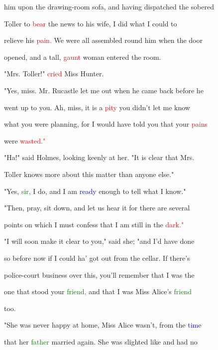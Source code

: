  him upon the drawing-room sofa, and having dispatched the sobered

 Toller to \textcolor{red}{bear} the news to his wife, I did what I could to

 relieve his \textcolor{red}{pain.} We were all assembled round him when the door

 opened, and a tall, \textcolor{red}{gaunt} woman entered the room.



 "Mrs. Toller!" \textcolor{red}{cried} Miss \textcolor{BurntOrange}{Hunter.}



 "Yes, miss. Mr. Rucastle let me out when he came back before he

 went up to you. Ah, miss, it is a \textcolor{red}{pity} you didn't let me know

 what you were \textcolor{BurntOrange}{planning,} for I would have told you that your \textcolor{red}{pains}

 were \textcolor{red}{wasted."}



 "Ha!" said Holmes, looking keenly at her. "It is clear that Mrs.

 Toller knows more about this matter than anyone else."



 "Yes, \textcolor{green}{sir,} I do, and I am \textcolor{blue}{ready} enough to tell what I know."



 "Then, \textcolor{BurntOrange}{pray,} sit down, and let us hear it for there are several

 points on which I must \textcolor{BurntOrange}{confess} that I am still in the \textcolor{red}{dark."}



 "I will soon make it clear to you," said she; "and I'd have done

 so before now if I could ha' got out from the cellar. If there's

 police-court business over this, you'll remember that I was the

 one that stood your \textcolor{green}{friend,} and that I was Miss Alice's \textcolor{green}{friend}

 too.



 "She was never \textcolor{BurntOrange}{happy} at home, Miss Alice wasn't, from the \textcolor{blue}{time}

 that her \textcolor{green}{father} married again. She was slighted like and had no

